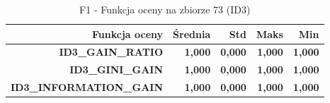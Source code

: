 \begin{table}[htbp]
\centering
\small
\setlength{\tabcolsep}{6pt}
\renewcommand{\arraystretch}{1.2}
\caption{F1 - Funkcja oceny na zbiorze 73 (ID3)}
\label{tab:ID3_eval_function_73_f1}
\begin{tabular}{r|r|r|r|r}
\toprule
Funkcja oceny & Średnia & Std & Maks & Min \\
\hline
\textbf{ID3\_GAIN\_RATIO} & \textbf{1,000} & \textbf{0,000} & \textbf{1,000} & \textbf{1,000} \\
\textbf{ID3\_GINI\_GAIN} & \textbf{1,000} & \textbf{0,000} & \textbf{1,000} & \textbf{1,000} \\
\textbf{ID3\_INFORMATION\_GAIN} & \textbf{1,000} & \textbf{0,000} & \textbf{1,000} & \textbf{1,000} \\
\bottomrule
\end{tabular}
\end{table}